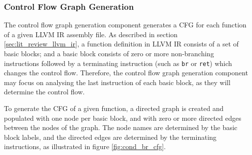 
\subsubsection{Control Flow Graph Generation}
\label{sec:design_control_flow_graph_generation}

The control flow graph generation component generates a CFG for each function of a given LLVM IR assembly file. As described in section \ref{sec:lit_review_llvm_ir}, a function definition in LLVM IR consists of a set of basic blocks; and a basic block consists of zero or more non-branching instructions followed by a terminating instruction (such as \texttt{br} or \texttt{ret}) which changes the control flow. Therefore, the control flow graph generation component may focus on analysing the last instruction of each basic block, as they will determine the control flow.

To generate the CFG of a given function, a directed graph is created and populated with one node per basic block, and with zero or more directed edges between the nodes of the graph. The node names are determined by the basic block labels, and the directed edges are determined by the terminating instructions, as illustrated in figure \ref{fig:cond_br_cfg}.

